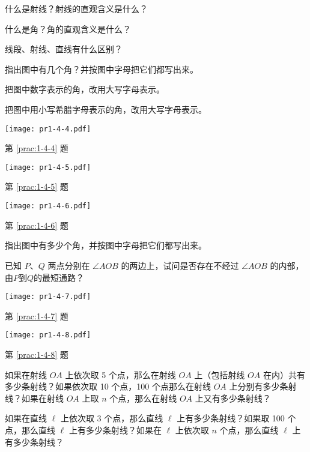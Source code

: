 \begin{Practice}
\begin{question}
	\item 什么是射线？射线的直观含义是什么？
	\item 什么是角？角的直观含义是什么？
	\item 线段、射线、直线有什么区别？
	\item\label{prac:1-4-4} 指出图中有几个角？并按图中字母把它们都写出来。
	\item\label{prac:1-4-5} 把图中数字表示的角，改用大写字母表示。
	\item\label{prac:1-4-6} 把图中用小写希腊字母表示的角，改用大写字母表示。
	\begin{figurehere}
		\begin{minipage}[b]{0.25\linewidth}\centering
			\texttt{[image: pr1-4-4.pdf]}
			\caption*{第 \ref{prac:1-4-4} 题}
		\end{minipage}%
		\begin{minipage}[b]{0.32\linewidth}\centering
			\texttt{[image: pr1-4-5.pdf]}
			\caption*{第 \ref{prac:1-4-5} 题}
		\end{minipage}%
		\begin{minipage}[b]{0.4\linewidth}\centering
			\texttt{[image: pr1-4-6.pdf]}
			\caption*{第 \ref{prac:1-4-6} 题}
		\end{minipage}
	\end{figurehere}
	\item\label{prac:1-4-7} 指出图中有多少个角，并按图中字母把它们都写出来。
	\item\label{prac:1-4-8} 已知 $P$、$Q$ 两点分别在 $\angle AOB$ 的两边上，试问是否存在不经过 $\angle AOB$ 的内部，由$	P$到$Q$的最短通路？
	\begin{figurehere}
		\begin{minipage}[b]{0.45\linewidth}\centering
		  \texttt{[image: pr1-4-7.pdf]}
			\caption*{第 \ref{prac:1-4-7} 题}
		\end{minipage}%
		\begin{minipage}[b]{0.45\linewidth}\centering
		  \texttt{[image: pr1-4-8.pdf]}
			\caption*{第 \ref{prac:1-4-8} 题}
		\end{minipage}
	\end{figurehere}
	\item 如果在射线 $OA$ 上依次取 5 个点，那么在射线 $OA$ 上（包括射线 $OA$ 在内）共有多少条射线？如果依次取 10 个点，100 个点那么在射线 $OA$ 上分别有多少条射线？如果在射线 $OA$ 上取 $n$ 个点，那么在射线 $OA$ 上又有多少条射线？
	\item 如果在直线 $\ell$ 上依次取 3 个点，那么直线 $\ell$ 上有多少条射线？如果取 100 个点，那么直线 $\ell$ 上有多少条射线？如果在 $\ell$ 上依次取 $n$ 个点，那么直线 $\ell$ 上有多少条射线？
\end{question}
\end{Practice}

